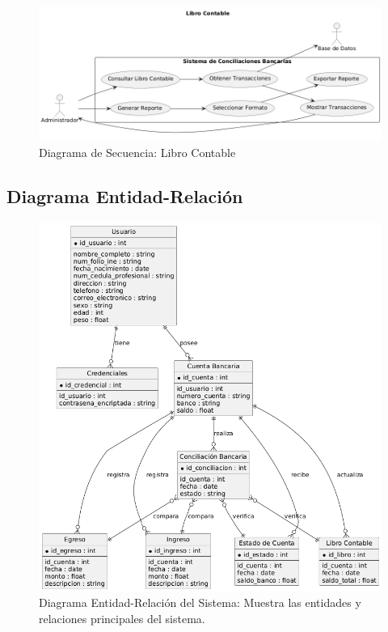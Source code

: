 \documentclass{article}
\begin{document}
\begin{figure}[H]
    \centering
    \includegraphics[width=\textwidth]{casos/LibroContable.png}
    \caption{Diagrama de Secuencia: Libro Contable}
\end{figure}

\subsection{Diagrama Entidad-Relación}
\begin{figure}[H]
    \centering
    \includegraphics[width=\textwidth]{casos/EntidadRelacion.png}
    \caption{Diagrama Entidad-Relación del Sistema: Muestra las entidades y relaciones principales del sistema.}
\end{figure}
\end{document}
